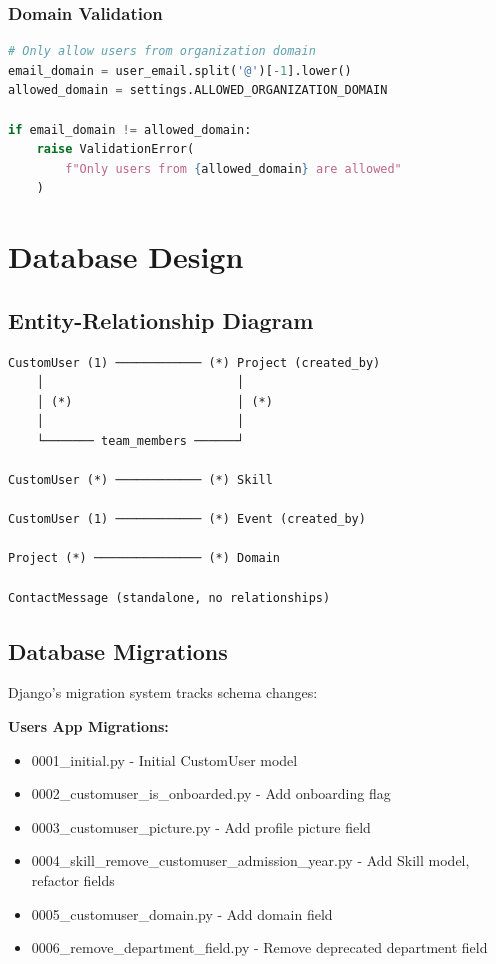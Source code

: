 \documentclass[11pt,a4paper]{article}
\begin{document}
\subsubsection{Domain Validation}
\begin{lstlisting}[language=Python]
# Only allow users from organization domain
email_domain = user_email.split('@')[-1].lower()
allowed_domain = settings.ALLOWED_ORGANIZATION_DOMAIN

if email_domain != allowed_domain:
    raise ValidationError(
        f"Only users from {allowed_domain} are allowed"
    )
\end{lstlisting}

\section{Database Design}

\subsection{Entity-Relationship Diagram}
\begin{verbatim}
CustomUser (1) ──────────── (*) Project (created_by)
    │                           │
    │ (*)                       │ (*)
    │                           │
    └─────── team_members ──────┘
    
CustomUser (*) ──────────── (*) Skill

CustomUser (1) ──────────── (*) Event (created_by)

Project (*) ─────────────── (*) Domain

ContactMessage (standalone, no relationships)
\end{verbatim}

\subsection{Database Migrations}
Django's migration system tracks schema changes:

\textbf{Users App Migrations:}
\begin{itemize}[leftmargin=*]
    \item 0001\_initial.py - Initial CustomUser model
    \item 0002\_customuser\_is\_onboarded.py - Add onboarding flag
    \item 0003\_customuser\_picture.py - Add profile picture field
    \item 0004\_skill\_remove\_customuser\_admission\_year.py - Add Skill model, refactor fields
    \item 0005\_customuser\_domain.py - Add domain field
    \item 0006\_remove\_department\_field.py - Remove deprecated department field
\end{itemize}
\end{document}

